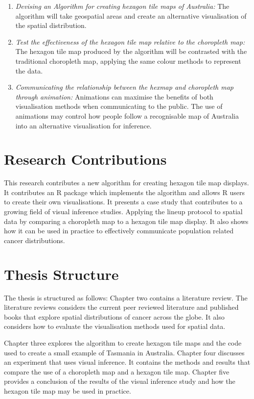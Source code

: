 \documentclass{monashthesis}
\begin{document}
\begin{enumerate}
\def\labelenumi{\arabic{enumi}.}
\item
  \emph{Devising an Algorithm for creating hexagon tile maps of Australia:} The algorithm will take geospatial areas and create an alternative visualisation of the spatial distribution.
\item
  \emph{Test the effectiveness of the hexagon tile map relative to the choropleth map:} The hexagon tile map produced by the algorithm will be contrasted with the traditional choropleth map, applying the same colour methods to represent the data.
\item
  \emph{Communicating the relationship between the hexmap and choropleth map through animation:} Animations can maximise the benefits of both visualisation methods when communicating to the public. The use of animations may control how people follow a recognisable map of Australia into an alternative visualisation for inference.
\end{enumerate}

\hypertarget{research-contributions}{%
\section{Research Contributions}\label{research-contributions}}

This research contributes a new algorithm for creating hexagon tile map displays. It contributes an R \autocite{R} package which implements the algorithm and allows R users to create their own visualisations.
It presents a case study that contributes to a growing field of visual inference studies. Applying the lineup protocol to spatial data by comparing a choropleth map to a hexagon tile map display.
It also shows how it can be used in practice to effectively communicate population related cancer distributions.

\hypertarget{thesis-structure}{%
\section{Thesis Structure}\label{thesis-structure}}

The thesis is structured as follows: Chapter two contains a literature review.
The literature reviews considers the current peer reviewed literature and published books that explore spatial distributions of cancer across the globe.
It also considers how to evaluate the visualisation methods used for spatial data.

Chapter three explores the algorithm to create hexagon tile maps and the code used to create a small example of Tasmania in Australia.
Chapter four discusses an experiment that uses visual inference. It contains the methods and results that compare the use of a choropleth map and a hexagon tile map.
Chapter five provides a conclusion of the results of the visual inference study and how the hexagon tile map may be used in practice.
\end{document}
